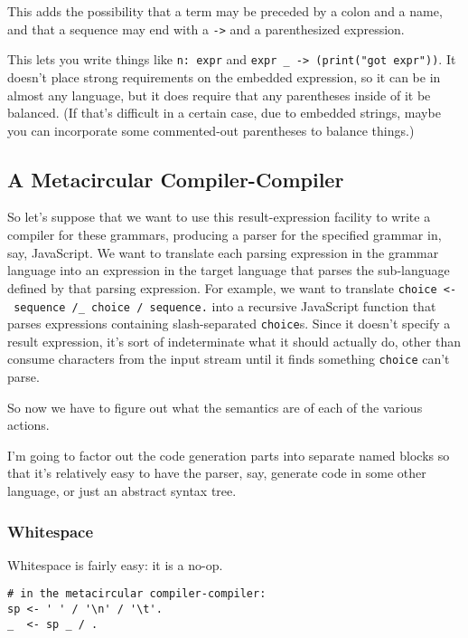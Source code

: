 \documentclass[
]{article}
\begin{document}
This adds the possibility that a term may be preceded by a colon and a
name, and that a sequence may end with a \texttt{-\textgreater{}} and a
parenthesized expression.

This lets you write things like \texttt{n:\ expr} and
\texttt{expr\ \_\ -\textgreater{}\ (print("got\ expr"))}. It doesn't
place strong requirements on the embedded expression, so it can be in
almost any language, but it does require that any parentheses inside of
it be balanced. (If that's difficult in a certain case, due to embedded
strings, maybe you can incorporate some commented-out parentheses to
balance things.)

\hypertarget{a-metacircular-compiler-compiler}{%
\subsection{A Metacircular
Compiler-Compiler}\label{a-metacircular-compiler-compiler}}

So let's suppose that we want to use this result-expression facility to
write a compiler for these grammars, producing a parser for the
specified grammar in, say, JavaScript. We want to translate each parsing
expression in the grammar language into an expression in the target
language that parses the sub-language defined by that parsing
expression. For example, we want to translate
\texttt{choice\ \textless{}-\ sequence\ \textquotesingle{}/\textquotesingle{}\_\ choice\ /\ sequence.}
into a recursive JavaScript function that parses expressions containing
slash-separated \texttt{choice}s. Since it doesn't specify a result
expression, it's sort of indeterminate what it should actually do, other
than consume characters from the input stream until it finds something
\texttt{choice} can't parse.

So now we have to figure out what the semantics are of each of the
various actions.

I'm going to factor out the code generation parts into separate named
blocks so that it's relatively easy to have the parser, say, generate
code in some other language, or just an abstract syntax tree.

\hypertarget{whitespace}{%
\subsubsection{Whitespace}\label{whitespace}}

Whitespace is fairly easy: it is a no-op.

\begin{verbatim}
# in the metacircular compiler-compiler:
sp <- ' ' / '\n' / '\t'.
_  <- sp _ / .
\end{verbatim}
\end{document}
